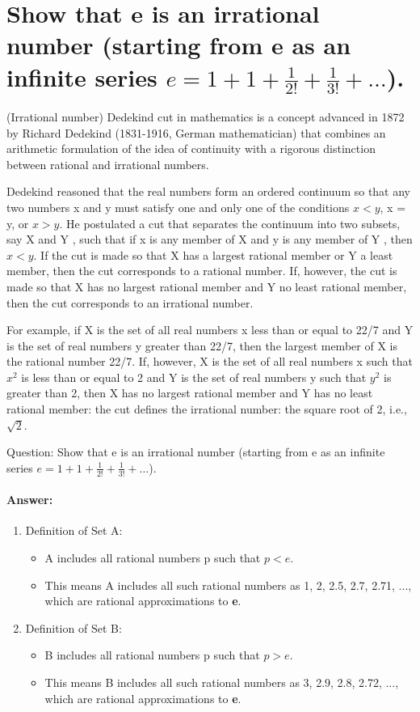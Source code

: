 \documentclass{article}
\begin{document}
\section{Show that e is an irrational number (starting from e as an infinite series $e = 1+1+ \frac{1}{2!}  + \frac{1}{3!} +\ldots $).}

(Irrational number) Dedekind cut in mathematics is a concept advanced in 1872 by Richard Dedekind (1831-1916, German mathematician) that combines an arithmetic formulation of the idea of continuity with a rigorous distinction between rational and irrational numbers. 

Dedekind reasoned that the real numbers form an ordered continuum so that any two numbers x and y must satisfy one and only one of the conditions $x < y$, x = y, or $x > y$. He postulated a cut that separates the continuum into two subsets, say X and Y , such that if x is any member of X and y is any member of Y , then $x < y$. If the cut is made so that X has a largest rational member or Y a least member, then the cut corresponds to a rational number. If, however, the cut is made so that X has no largest rational member and Y no least rational member, then the cut corresponds to an irrational number.

For example, if X is the set of all real numbers x less than or equal to 22/7 and Y is the set of real numbers y greater than 22/7, then the largest member of X is the rational number 22/7. If, however, X is the set of all real numbers x such that $x^2$ is less than or equal to 2 and Y is the set of real numbers y such that $y^2$ is greater than 2, then X has no largest rational member and Y has no least rational member: the cut defines the irrational number: the square root of 2, i.e., $\sqrt{2}$.
\begin{tcolorbox}
  Question: Show that e is an irrational number (starting from e as an infinite series $e = 1+1+ \frac{1}{2!}  + \frac{1}{3!} +\ldots $).
\end{tcolorbox}


\paragraph{Answer:}
\begin{enumerate}
  \item Definition of Set A:
  \begin{itemize}
    \item A includes all rational numbers p such that $p < e$.
    \item This means A includes all such rational numbers as 1, 2, 2.5, 2.7, 2.71, ..., which are rational approximations to \textbf{e}.
  \end{itemize}
  \item Definition of Set B:
  \begin{itemize}
    \item B includes all rational numbers p such that $p > e$.
    \item This means B includes all such rational numbers as 3, 2.9, 2.8, 2.72, ..., which are rational approximations to \textbf{e}.
  \end{itemize}
\end{enumerate}
\end{document}
